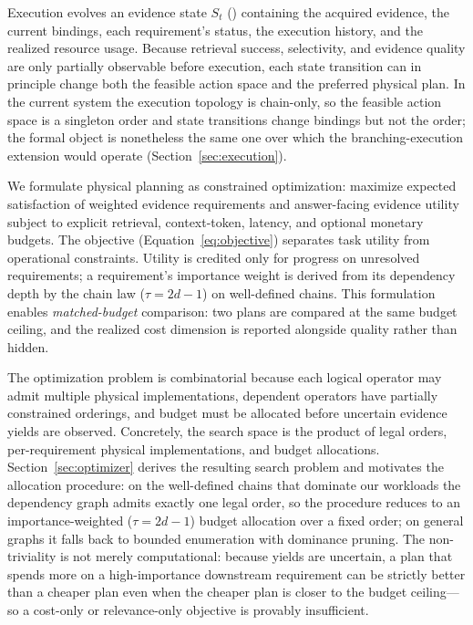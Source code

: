 Execution evolves an evidence state $S_t$ () containing the
acquired evidence, the current bindings, each requirement's status, the
execution history, and the realized resource usage. Because retrieval success,
selectivity, and evidence quality are only partially observable before
execution, each state transition can in principle change both the feasible
action space and the preferred physical plan. In the current system the
execution topology is chain-only, so the feasible action space is a singleton
order and state transitions change bindings but not the order; the formal
object is nonetheless the same one over which the branching-execution extension
would operate (Section~\ref{sec:execution}).

We formulate physical planning as constrained optimization: maximize expected
satisfaction of weighted evidence requirements and answer-facing evidence
utility subject to explicit retrieval, context-token, latency, and optional
monetary budgets. The objective (Equation~\ref{eq:objective}) separates task
utility from operational constraints. Utility is credited only for progress on
unresolved requirements; a requirement's importance weight is derived from its
dependency depth by the chain law ($\tau = 2d-1$) on well-defined chains. This
formulation enables \emph{matched-budget} comparison: two plans are compared at
the same budget ceiling, and the realized cost dimension is reported alongside
quality rather than hidden.

The optimization problem is combinatorial because each logical operator may
admit multiple physical implementations, dependent operators have partially
constrained orderings, and budget must be allocated before uncertain evidence
yields are observed. Concretely, the search space is the product of legal
orders, per-requirement physical implementations, and budget allocations.
Section~\ref{sec:optimizer} derives the resulting search problem and motivates
the allocation procedure: on the well-defined chains that dominate our
workloads the dependency graph admits exactly one legal order, so the
procedure reduces to an importance-weighted ($\tau = 2d-1$) budget allocation
over a fixed order; on general graphs it falls back to bounded enumeration with
dominance pruning. The non-triviality is not merely
computational: because yields are uncertain, a plan that spends more on a
high-importance downstream requirement can be strictly better than a cheaper
plan even when the cheaper plan is closer to the budget ceiling---so a
cost-only or relevance-only objective is provably insufficient.
